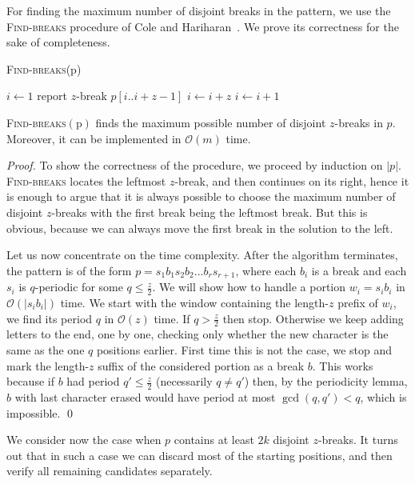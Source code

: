 \documentclass[runningheads]{llncs}
\newcommand{\proc}[1]{\textnormal{\scshape#1}}
\begin{document}
For finding the maximum number of disjoint breaks in the pattern, we use the \proc{Find-breaks} procedure of Cole and Hariharan~\cite{ColeHariharan}. We prove its correctness for the sake of completeness.

\begin{algorithm}[t]
\caption{\proc{Find-breaks}(p)}
\begin{algorithmic}[1]
\State $i\gets 1$
\State report $z$-break $p[i..i+z-1]$
\State $i \gets i+z$
\Else
\State $i\gets i+1$
\EndIf
\EndWhile
\end{algorithmic}
\end{algorithm}

\begin{lemma}\label{lemma:finding_breaks}
\proc{Find-breaks}$\mathrm{(p)}$ finds the maximum possible number of disjoint $z$-breaks in $p$. Moreover, it can be implemented in $\mathcal{O}(m)$ time.
\end{lemma}
\begin{proof}
To show the correctness of the procedure, we proceed by induction on $|p|$.  \proc{Find-breaks} locates the leftmost $z$-break, and then continues on 
its right, hence it is enough to argue that it is always possible to choose the maximum number of disjoint $z$-breaks with the first break being the
leftmost break. But this is obvious, because we can always move the first break in the solution to the left.

Let us now concentrate on the time complexity. After the algorithm terminates, the pattern is of the form $p=s_1b_1s_2b_2...b_{r}s_{r+1}$, where each $b_i$ is a break and each $s_i$ is $q$-periodic for some $q\leq \frac{z}{2}$.  We will show how to handle a portion $w_i=s_ib_i$ in $\mathcal{O}(|s_ib_i|)$ time. We start with the window containing the length-$z$ prefix of $w_i$, we find its period $q$ in $\mathcal{O}(z)$ time. If $q>\frac{z}{2}$ then stop. Otherwise we keep adding letters to the end, one by one, checking only whether the new character is the same as the one $q$ positions earlier. First time this is not the case, we stop and mark the length-$z$ suffix of the considered portion as a break $b$. This works because if $b$ had period $q'\leq \frac{z}{2}$ (necessarily $q\neq q'$) then, by the periodicity lemma, $b$ with last character erased would have period at most $\gcd(q,q')<q$, which is impossible.
\qed
\end{proof}

We consider now the case when $p$ contains at least $2k$ disjoint $z$-breaks. It turns out that in such a case we can discard most of the starting positions, and then verify all remaining candidates separately.
\end{document}
